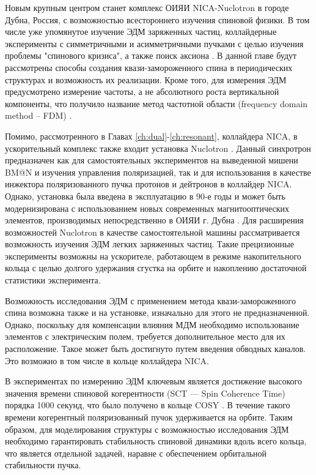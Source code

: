 \par Новым крупным центром станет комплекс ОИЯИ NICA-Nuclotron в городе Дубна, Россия, с возможностью всестороннего изучения спиновой физики. В том числе уже упомянутое изучение ЭДМ заряженных частиц, коллайдерные эксперименты с симметричными и асимметричными пучками с целью изучения проблемы "спинового кризиса"\cite{ST_Filatov}, а также поиск аксиона \cite{Axion_Nikolaev}. В данной главе будут рассмотрены способы создания квази-замороженного спина в периодических структурах и возможность их реализации. Кроме того, для измерения ЭДМ предусмотрено измерение частоты, а не абсолютного роста вертикальной компоненты, что получило название метод частотной области (frequency domain method -- FDM) \cite{FDM}.

\par Помимо, рассмотренного в Главах \ref{ch:dual}-\ref{ch:resonant}, коллайдера NICA, в ускорительный комплекс также входит установка Nuclotron \cite{nuclotron24}. Данный синхротрон предназначен как для самостоятельных экспериментов на выведенной мишени BM@N и изучения управления поляризацией, так и для использования в качестве инжектора поляризованного пучка протонов и дейтронов в коллайдер NICA. Однако, установка была введена в эксплуатацию в 90-е годы \cite{baldin:nuclotron} и может быть модернизирована с использованием новых современных магнитооптических элементов, производимых непосредственно в ОИЯИ г. Дубна \cite{korovkin:nica_magnets}. Для расширения возможностей Nuclotron в качестве самостоятельной машины рассматривается возможность изучения ЭДМ легких заряженных частиц. Такие прецизионные эксперименты возможны на ускорителе, работающем в режиме накопительного кольца с целью долгого удержания сгустка на орбите и накоплению достаточной статистики эксперимента. 

\par Возможность исследования ЭДМ с применением метода квази-замороженного спина возможна также и на установке, изначально для этого не предназначенной. Однако, поскольку для компенсации влияния МДМ необходимо использование элементов с электрическим полем, требуется дополнительное место для их расположение. Такое может быть достигнуто путем введения обводных каналов. Это возможно в том числе в кольце коллайдера NICA.

\par В экспериментах по измерению ЭДМ ключевым является достижение высокого значения времени спиновой когерентности (SCT — Spin Coherence Time) порядка 1000 секунд, что было получено в кольце COSY \cite{AGSproposal}. В течение такого времени когерентный поляризованный пучок удерживается на орбите. Таким образом, для моделирования структуры с возможностью исследования ЭДМ необходимо гарантировать стабильность спиновой динамики вдоль всего кольца, что является отдельной задачей, наравне с обеспечением орбитальной стабильности пучка.

